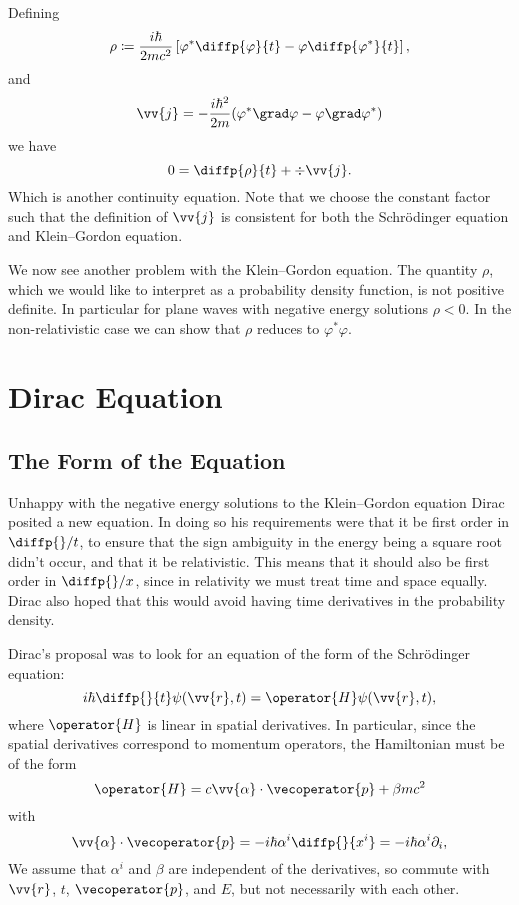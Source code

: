 \documentclass[fleqn]{NotesClass}
\newcommand*{\hamiltonian}{H}
\begin{document}
    Defining
    \begin{equation}
        \rho \coloneqq \frac{i\hbar}{2mc^2}\left[ \varphi^*\diffp{\varphi}{t} - \varphi\diffp{\varphi^*}{t} \right],
    \end{equation}
    and
    \begin{equation}
        \vv{j} = -\frac{i\hbar^2}{2m}(\varphi^*\grad\varphi - \varphi\grad\varphi^*)
    \end{equation}
    we have
    \begin{equation}
        0 = \diffp{\rho}{t} + \div\vv{j}.
    \end{equation}
    Which is another continuity equation.
    Note that we choose the constant factor such that the definition of \(\vv{j}\) is consistent for both the Schr\"odinger equation and Klein--Gordon equation.
    
    We now see another problem with the Klein--Gordon equation.
    The quantity \(\rho\), which we would like to interpret as a probability density function, is not positive definite.
    In particular for plane waves with negative energy solutions \(\rho < 0\).
    In the non-relativistic case we can show that \(\rho\) reduces to \(\varphi^*\varphi\).
    
    \chapter{Dirac Equation}
    \section{The Form of the Equation}
    Unhappy with the negative energy solutions to the Klein--Gordon equation Dirac posited a new equation.
    In doing so his requirements were that it be first order in \(\diffp{}/{t}\), to ensure that the sign ambiguity in the energy being a square root didn't occur, and that it be relativistic.
    This means that it should also be first order in \(\diffp{}/{x}\), since in relativity we must treat time and space equally.
    Dirac also hoped that this would avoid having time derivatives in the probability density.
    
    Dirac's proposal was to look for an equation of the form of the Schr\"odinger equation:
    \begin{equation}
        i\hbar\diffp{}{t}\psi(\vv{r}, t) = \operator{\hamiltonian}\psi(\vv{r}, t),
    \end{equation}
    where \(\operator{\hamiltonian}\) is linear in spatial derivatives.
    In particular, since the spatial derivatives correspond to momentum operators, the Hamiltonian must be of the form
    \begin{equation}
        \operator{\hamiltonian} = c\vv{\alpha}\cdot\vecoperator{p} + \beta mc^2
    \end{equation}
    with
    \begin{equation}
        \vv{\alpha} \cdot \vecoperator{p} = -i\hbar \alpha^i\diffp{}{x^i} = -i\hbar \alpha^i\partial_i,
    \end{equation}
    We assume that \(\alpha^i\) and \(\beta\) are independent of the derivatives, so commute with \(\vv{r}\), \(t\), \(\vecoperator{p}\), and \(E\), but not necessarily with each other.
    
\end{document}
